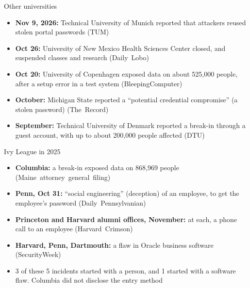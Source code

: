 \documentclass[11pt]{beamer}
\newcommand{\srccite}[1]{{\scriptsize\textcolor{citecol}{#1}}}
\newcommand{\vfy}{\unskip}
\newcommand{\vfy}{\unskip\nobreakspace{\scriptsize\textcolor{citecol}{[verify]}}}
\renewcommand{\srccite}[1]{{\scriptsize\textcolor{citecol}{\mbox{#1}}}}
\begin{document}
\begin{frame}{Other universities}
\pause
\begin{itemize}\setlength\itemsep{8pt}
\item \textbf{Nov 9, 2026:} Technical University of Munich reported that attackers reused stolen portal passwords \srccite{(TUM)} \vfy \pause
\item \textbf{Oct 26:} University of New Mexico Health Sciences Center closed, and suspended classes and research \srccite{(Daily Lobo)} \vfy \pause
\item \textbf{Oct 20:} University of Copenhagen exposed data on about 525,000 people, after a setup error in a test system \srccite{(BleepingComputer)} \vfy \pause
\item \textbf{October:} Michigan State reported a ``potential credential compromise'' (a stolen password) \srccite{(The Record)} \vfy \pause
\item \textbf{September:} Technical University of Denmark reported a break-in through a guest account, with up to about 200,000 people affected \srccite{(DTU)} \vfy
\end{itemize}
\end{frame}


\begin{frame}{Ivy League in 2025}
\pause
\begin{itemize}\setlength\itemsep{8pt}
\item \textbf{Columbia:} a break-in exposed data on 868,969 people \srccite{(Maine attorney general filing)} \vfy \pause
\item \textbf{Penn, Oct 31:} ``social engineering'' (deception) of an employee, to get the employee's password \srccite{(Daily Pennsylvanian)} \vfy \pause
\item \textbf{Princeton and Harvard alumni offices, November:} at each, a phone call to an employee \srccite{(Harvard Crimson)} \vfy \pause
\item \textbf{Harvard, Penn, Dartmouth:} a flaw in Oracle business software \srccite{(SecurityWeek)} \vfy \pause
\item[$\rightarrow$] 3 of these 5 incidents started with a person, and 1 started with a software flaw. Columbia did not disclose the entry method \vfy
\end{itemize}
\end{frame}
\end{document}
